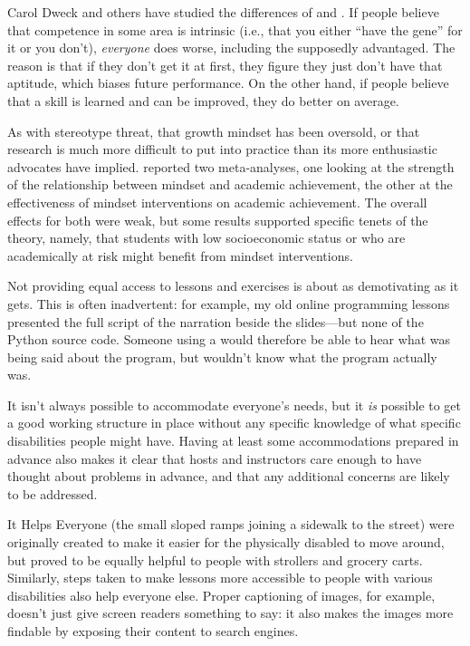Carol Dweck and others have studied the differences of
 and
. If people believe that
competence in some area is intrinsic (i.e., that you either ``have the
gene'' for it or you don't), \emph{everyone} does worse, including the
supposedly advantaged. The reason is that if they don't get it at first,
they figure they just don't have that aptitude, which biases future
performance. On the other hand, if people believe that a skill is
learned and can be improved, they do better on average.

As with stereotype threat, 
that growth mindset has been oversold, or that research is much more
difficult to put into practice than its more enthusiastic advocates
have implied. \cite{Sisk2018} reported two meta-analyses, one
looking at the strength of the relationship between mindset and
academic achievement, the other at the effectiveness of mindset
interventions on academic achievement. The overall effects for both
were weak, but some results supported specific tenets of the theory,
namely, that students with low socioeconomic status or who are
academically at risk might benefit from mindset interventions.


Not providing equal access to lessons and exercises is about as
demotivating as it gets. This is often inadvertent: for example, my
old online programming lessons presented the full script of the
narration beside the slides---but none of the Python source
code. Someone using a  would therefore
be able to hear what was being said about the program, but wouldn't
know what the program actually was.

It isn't always possible to accommodate everyone's needs, but it \emph{is}
possible to get a good working structure in place without any specific
knowledge of what specific disabilities people might have. Having at
least some accommodations prepared in advance also makes it clear that
hosts and instructors care enough to have thought about problems in
advance, and that any additional concerns are likely to be addressed.

\begin{aside}{It Helps Everyone}
   (the small sloped ramps joining a sidewalk to
  the street) were originally created to make it easier for the
  physically disabled to move around, but proved to be equally helpful
  to people with strollers and grocery carts. Similarly, steps taken
  to make lessons more accessible to people with various disabilities
  also help everyone else. Proper captioning of images, for example,
  doesn't just give screen readers something to say: it also makes the
  images more findable by exposing their content to search engines.
\end{aside}

